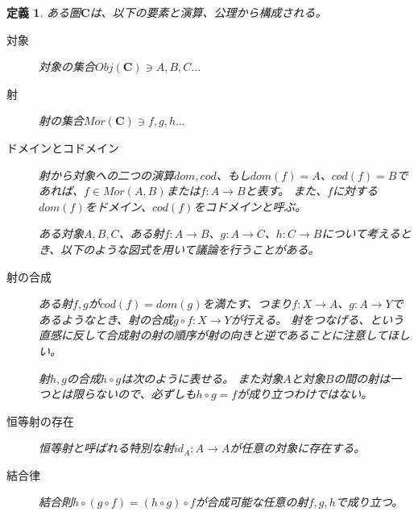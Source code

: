 \documentclass[dvipdfmx]{jsarticle}
\newcommand{\cat}[1]{\boldsymbol{#1}}
\newcommand{\arrow}{\rightarrow}
\newcommand{\obj}[1]{Obj(\cat{#1})}
\newcommand{\mor}[3]{#1:#2\arrow #3}
\newtheorem{define}{定義}[section]
\numberwithin{proof}{subsection}
\numberwithin{prop}{subsection}
\numberwithin{define}{subsection}
\begin{document}
	\begin{define}
		ある圏$\cat{C}$は、以下の要素と演算、公理から構成される。
		\begin{description}
			\item[対象] 対象の集合$\obj{C}\ni A,B,C...$
			\item[射] 射の集合$Mor(\cat{C})\ni f,g,h...$
			\item[ドメインとコドメイン] 射から対象への二つの演算$dom,cod$、もし$dom(f)=A$、$cod(f)=B$であれば、$f\in Mor(A,B)$または$\mor{f}{A}{B}$と表す。
			また、$f$に対する$dom(f)$をドメイン、$cod(f)$をコドメインと呼ぶ。

			ある対象$A,B,C$、ある射$\mor{f}{A}{B}$、$\mor{g}{A}{C}$、$\mor{h}{C}{B}$について考えるとき、以下のような図式を用いて議論を行うことがある。
			\begin{center}
			\end{center}

			\item[射の合成] ある射$f,g$が$cod(f)=dom(g)$を満たす、つまり$\mor{f}{X}{A}$、$\mor{g}{A}{Y}$であるようなとき、射の合成$\mor{g\circ f}{X}{Y}$が行える。
			射をつなげる、という直感に反して合成射の射の順序が射の向きと逆であることに注意してほしい。

			射$h,g$の合成$h\circ g$は次のように表せる。
			また対象$A$と対象$B$の間の射は一つとは限らないので、必ずしも$h\circ g=f$が成り立つわけではない。
			\begin{center}
			\end{center}
			\item[恒等射の存在] 恒等射と呼ばれる特別な射$\mor{id_A}{A}{A}$が任意の対象に存在する。
			\item[結合律] 結合則$h\circ (g\circ f)=(h\circ g)\circ f$が合成可能な任意の射$f,g,h$で成り立つ。


\end{description}
\end{define}
\end{document}

